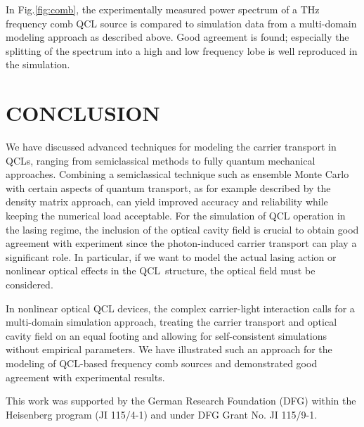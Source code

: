 \documentclass[a4paper]{spie}%
\begin{document}
In Fig.\thinspace\ref{fig:comb}, the experimentally measured power spectrum of
a THz frequency comb QCL source \cite{burghoff2015evaluating} is compared to
simulation data from a multi-domain modeling approach as described above. Good
agreement is found; especially the splitting of the spectrum into a high and
low frequency lobe is well reproduced in the simulation.

\section{CONCLUSION}

\label{sec:concl}

We have discussed advanced techniques for modeling the carrier transport in
QCLs, ranging from semiclassical methods to fully quantum mechanical
approaches. Combining a semiclassical technique such as ensemble Monte Carlo
with certain aspects of quantum transport, as for example described by the
density matrix approach, can yield improved accuracy and reliability while
keeping the numerical load acceptable. For the simulation of QCL operation in
the lasing regime, the inclusion of the optical cavity field is crucial to
obtain good agreement with experiment since the photon-induced carrier
transport can play a significant role. In particular, if we want to model the
actual lasing action or nonlinear optical effects in the QCL\ structure, the
optical field must be considered.

In nonlinear optical QCL devices, the complex carrier-light interaction calls
for a multi-domain simulation approach, treating the carrier transport and
optical cavity field on an equal footing and allowing for self-consistent
simulations without empirical parameters. We have illustrated such an approach
for the modeling of QCL-based frequency comb sources and demonstrated good
agreement with experimental results.

\acknowledgments

This work was supported by the German Research Foundation (DFG) within the
Heisenberg program (JI 115/4-1) and under DFG Grant No. JI 115/9-1.%



\end{document}
